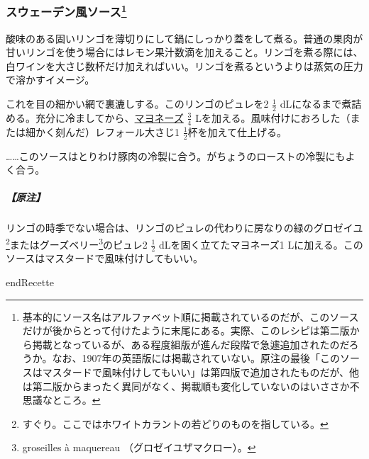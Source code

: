 \begin{recette}
\atoaki{}

\hypertarget{sauce-suedoise}{%
\subsubsection[スウェーデン風ソース]{\texorpdfstring{スウェーデン風ソース\footnote{基本的にソース名はアルファベット順に掲載されているのだが、このソースだけが後からとって付けたように末尾にある。実際、このレシピは第二版から掲載となっているが、ある程度組版が進んだ段階で急遽追加されたのだろうか。なお、1907年の英語版には掲載されていない。原注の最後「このソースはマスタードで風味付けしてもいい」は第四版で追加されたものだが、他は第二版からまったく異同がなく、掲載順も変化していないのはいささか不思議なところ。}}{スウェーデン風ソース}}\label{sauce-suedoise}}



酸味のある固いリンゴを薄切りにして鍋にしっかり蓋をして煮る。普通の果肉が甘いリンゴを使う場合にはレモン果汁数滴を加えること。リンゴを煮る際には、白ワインを大さじ数杯だけ加えればいい。リンゴを煮るというよりは蒸気の圧力で溶かすイメージ。

これを目の細かい網で裏漉しする。このリンゴのピュレを2 \(\frac{1}{2}\)
dLになるまで煮詰める。充分に冷ましてから、\protect\hyperlink{mayonnaise}{マヨネーズ}
\(\frac{3}{4}\)
Lを加える。風味付けにおろした（または細かく刻んだ）レフォール大さじ1
\(\frac{1}{2}\)杯を加えて仕上げる。

\ldots{}\ldots{}このソースはとりわけ豚肉の冷製に合う。がちょうのローストの冷製にもよく合う。

\hypertarget{nota-sauce-suedoise}{%
\subparagraph{【原注】}\label{nota-sauce-suedoise}}

リンゴの時季でない場合は、リンゴのピュレの代わりに房なりの緑のグロゼイユ\footnote{すぐり。ここではホワイトカラントの若どりのものを指している。}またはグーズベリー\footnote{groseilles
  à maquereau （グロゼイユザマクロー）。}のピュレ2 \(\frac{1}{2}\)
dLを固く立てたマヨネーズ1
Lに加える。このソースはマスタードで風味付けしてもいい。

endRecette

\hypertarget{sauces-froides-anglaises}{%
}
\end{recette}
